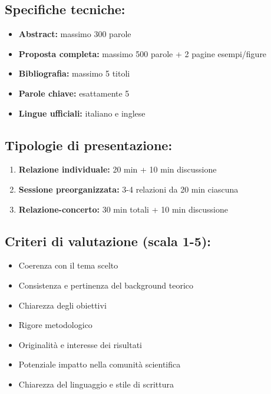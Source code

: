\documentclass[12pt,a4paper]{article}
\begin{document}
\subsection*{Specifiche tecniche:}
\begin{itemize}
    \item \textbf{Abstract:} massimo 300 parole
    \item \textbf{Proposta completa:} massimo 500 parole + 2 pagine esempi/figure
    \item \textbf{Bibliografia:} massimo 5 titoli
    \item \textbf{Parole chiave:} esattamente 5
    \item \textbf{Lingue ufficiali:} italiano e inglese
\end{itemize}

\subsection*{Tipologie di presentazione:}
\begin{enumerate}
    \item \textbf{Relazione individuale:} 20 min + 10 min discussione
    \item \textbf{Sessione preorganizzata:} 3-4 relazioni da 20 min ciascuna
    \item \textbf{Relazione-concerto:} 30 min totali + 10 min discussione
\end{enumerate}

\subsection*{Criteri di valutazione (scala 1-5):}
\begin{itemize}
    \item Coerenza con il tema scelto
    \item Consistenza e pertinenza del background teorico
    \item Chiarezza degli obiettivi
    \item Rigore metodologico
    \item Originalità e interesse dei risultati
    \item Potenziale impatto nella comunità scientifica
    \item Chiarezza del linguaggio e stile di scrittura
\end{itemize}
\end{document}
